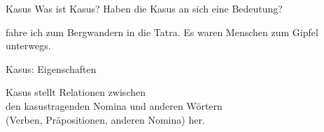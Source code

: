 \begin{frame}
  {Kasus}
  \pause
  Was ist Kasus? Haben die Kasus an sich eine Bedeutung?
  \Halbzeile
  \pause
  \begin{exe}
    \ex
    \begin{xlist}
      \pause
      \pause
      \pause
    \end{xlist}
    \pause
    \ex
    \begin{xlist}
      \ex {} fahre ich zum Bergwandern in die Tatra.
      \ex Es waren  Menschen zum Gipfel unterwegs.
    \end{xlist}
    \pause
    \ex
    \begin{xlist}
      \pause
      \pause
      \pause
    \end{xlist}
  \end{exe}
\end{frame}


\begin{frame}
  {Kasus: Eigenschaften}
  \pause
  \centering

  \Large
  Kasus stellt \alert{Relationen zwischen\\
  den kasustragenden Nomina und anderen Wörtern}\\
  (Verben, Präpositionen, anderen Nomina) her.\\
\end{frame}

